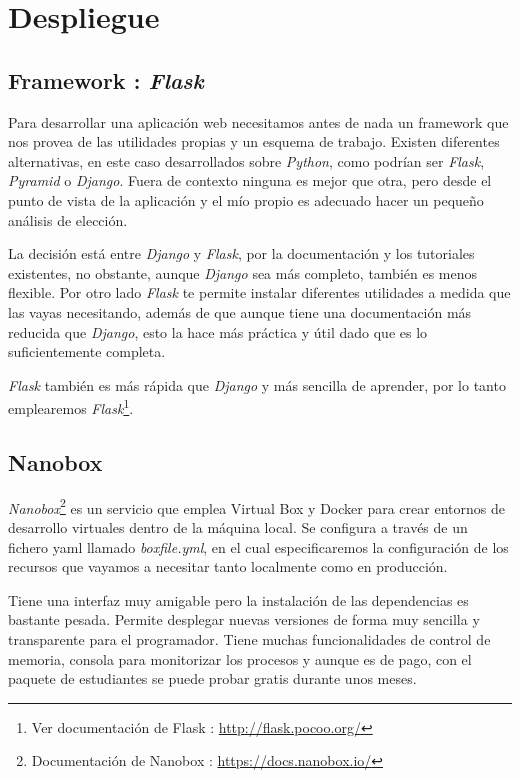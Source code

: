 \section{Despliegue}
\subsection{Framework : \textit{Flask}}
Para desarrollar una aplicación web necesitamos antes de nada un framework que nos provea de las utilidades propias y un esquema de trabajo. Existen diferentes alternativas, en este caso desarrollados sobre \textit{Python}, como podrían ser \textit{Flask}, \textit{Pyramid} o \textit{Django}. Fuera de contexto ninguna es mejor que otra, pero desde el punto de vista de la aplicación y el mío propio es adecuado hacer un pequeño análisis de elección.

La decisión está entre\textit{ Django} y \textit{Flask}, por la documentación y los tutoriales existentes, no obstante, aunque \textit{Django} sea más completo, también es menos flexible. Por otro lado \textit{Flask} te permite instalar diferentes utilidades a medida que las vayas necesitando, además de que aunque tiene una documentación más reducida que \textit{Django}, esto la hace más práctica y útil dado que es lo suficientemente completa.

 \textit{Flask} también es más rápida que \textit{Django} y más sencilla de aprender, por lo tanto emplearemos \textit{Flask}\footnote{Ver documentación de Flask : \url{http://flask.pocoo.org/}}.

\subsection{Nanobox}
\textit{Nanobox}\footnote{Documentación de Nanobox : \url{https://docs.nanobox.io/}} es un servicio que emplea Virtual Box y Docker para crear entornos de desarrollo virtuales dentro de la máquina local. Se configura a través de un fichero yaml llamado \textit{boxfile.yml}, en el cual especificaremos la configuración de los recursos que vayamos a necesitar tanto localmente como en producción. 

Tiene una interfaz muy amigable pero la instalación de las dependencias es bastante pesada. Permite desplegar nuevas versiones de forma muy sencilla y transparente para el programador. Tiene muchas funcionalidades de control de memoria, consola para monitorizar los procesos y aunque es de pago, con el paquete de estudiantes se puede probar gratis durante unos meses.

